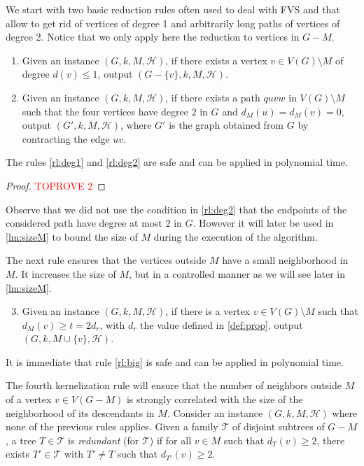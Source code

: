 \documentclass{amsart}
\newcommand{\KR}[1]{KR$_ #1$}
\newcommand{\T}{\mathcal{T}}
\newcommand{\dM}{d_M}
\newcommand{\mH}{\mathcal{H}}
\newcommand{\FVS}{\textsc{FVS}\xspace}
\newcommand{\ruleref}[1]{\hyperref[#1]{\ref*{#1}}}
\begin{document}
We start with two basic reduction rules often used to deal with \FVS and that allow to get rid of vertices of degree 1 and arbitrarily long paths of vertices of degree 2. Notice that we only apply here the reduction to vertices in $G-M$.
\begin{enumerate}[label=(\KR{{\arabic*}})]
\item \label{rl:deg1} Given an instance $(G, k, M, \mH)$, if there exists a vertex $v\in V(G)\setminus M$ of degree $d(v)\leq 1$, output $(G-\{v\}, k, M, \mH)$.

\item \label{rl:deg2} Given an instance $(G, k, M, \mH)$, if there exists a path $quvw$ in $V(G)\setminus M$ such that the four vertices have degree $2$ in $G$ and $\dM(u)=\dM(v)=0$, output $(G', k, M, \mH)$, where $G'$ is the graph obtained from $G$ by contracting the edge $uv$.
\end{enumerate}
\begin{lemma}
    The rules \ruleref{rl:deg1} and \ruleref{rl:deg2} are safe and can be applied in polynomial time.
\end{lemma}
\begin{proof}\textcolor{red}{TOPROVE 2}\end{proof}
\begin{remark}
Observe that we did not use the condition in \ruleref{rl:deg2} that the endpoints of the considered path have degree at most $2$ in $G$. However it will later be used in \autoref{lm:sizeM} to bound the size of $M$ during the execution of the algorithm.
\end{remark}

The next rule ensures that the vertices outside $M$ have a small neighborhood in $M$. It increases the size of $M$, but in a controlled manner as we will see later in \autoref{lm:sizeM}. 

\begin{enumerate}[label=(\KR{{\arabic*}})]
\setcounter{enumi}{2}
\item \label{rl:big} Given an instance $(G, k, M, \mH)$, if there is a vertex $v\in V(G)\setminus M$ such that $d_M(v)\ge t=2d_r$, with $d_r$ the value defined in \autoref{def:prop}, output $(G, k, M\cup\{v\}, \mH)$.
\end{enumerate}
It is immediate that rule \ruleref{rl:big} is safe and can be applied in polynomial time.


The fourth kernelization rule will ensure that the number of neighbors outside $M$ of a vertex $v\in V(G-M)$ is strongly correlated with the size of the neighborhood of its descendants in $M$. 
Consider an instance $(G,k,M,\mH)$ where none of the previous rules applies. 
Given a family $\T$ of disjoint subtrees of $G-M$, a tree $T\in \T$ is {\em redundant} (for $\T$) if for all $v\in M$ such that $d_T(v)\geq 2$, there exists $T'\in \T$ with $T'\neq T$ such that $d_{T'}(v)\geq 2$.
\end{document}
